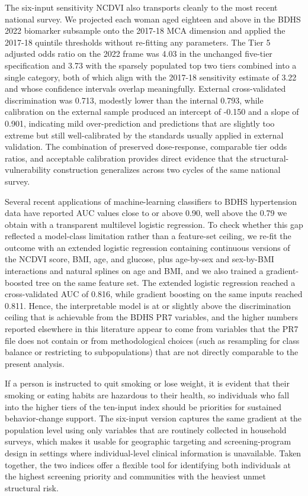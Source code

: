 \documentclass[
  12pt,
  a4paper]{article}
\begin{document}
The six-input sensitivity NCDVI also transports cleanly to the most recent national survey. We projected each woman aged eighteen and above in the BDHS 2022 biomarker subsample onto the 2017-18 MCA dimension and applied the 2017-18 quintile thresholds without re-fitting any parameters. The Tier 5 adjusted odds ratio on the 2022 frame was 4.03 in the unchanged five-tier specification and 3.73 with the sparsely populated top two tiers combined into a single category, both of which align with the 2017-18 sensitivity estimate of 3.22 and whose confidence intervals overlap meaningfully. External cross-validated discrimination was 0.713, modestly lower than the internal 0.793, while calibration on the external sample produced an intercept of -0.150 and a slope of 0.901, indicating mild over-prediction and predictions that are slightly too extreme but still well-calibrated by the standards usually applied in external validation. The combination of preserved dose-response, comparable tier odds ratios, and acceptable calibration provides direct evidence that the structural-vulnerability construction generalizes across two cycles of the same national survey.

Several recent applications of machine-learning classifiers to BDHS hypertension data have reported AUC values close to or above 0.90, well above the 0.79 we obtain with a transparent multilevel logistic regression. To check whether this gap reflected a model-class limitation rather than a feature-set ceiling, we re-fit the outcome with an extended logistic regression containing continuous versions of the NCDVI score, BMI, age, and glucose, plus age-by-sex and sex-by-BMI interactions and natural splines on age and BMI, and we also trained a gradient-boosted tree on the same feature set. The extended logistic regression reached a cross-validated AUC of 0.816, while gradient boosting on the same inputs reached 0.811. Hence, the interpretable model is at or slightly above the discrimination ceiling that is achievable from the BDHS PR7 variables, and the higher numbers reported elsewhere in this literature appear to come from variables that the PR7 file does not contain or from methodological choices (such as resampling for class balance or restricting to subpopulations) that are not directly comparable to the present analysis.

If a person is instructed to quit smoking or lose weight, it is evident that their smoking or eating habits are hazardous to their health, so individuals who fall into the higher tiers of the ten-input index should be priorities for sustained behavior-change support. The six-input version captures the same gradient at the population level using only variables that are routinely collected in household surveys, which makes it usable for geographic targeting and screening-program design in settings where individual-level clinical information is unavailable. Taken together, the two indices offer a flexible tool for identifying both individuals at the highest screening priority and communities with the heaviest unmet structural risk.
\end{document}
